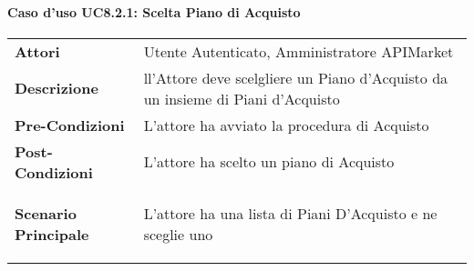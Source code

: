 \paragraph{Caso d'uso UC8.2.1: Scelta Piano di Acquisto}
\label{UC8.2.1}

\renewcommand*{\arraystretch}{1.6}
\begin{longtable}{ l | p{11cm}}
	\hline
	\rowcolor{Gray}
	\multicolumn{2}{c}{UC8.2.1: Scelta Piano di Acquisto} \\
	\hline
	\textbf{Attori} &Utente Autenticato, Amministratore APIMarket\\
	\textbf{Descrizione} & ll'Attore deve scelgliere un Piano d'Acquisto da un insieme di Piani d'Acquisto\\
	\textbf{Pre-Condizioni} &  L'attore ha avviato la procedura di Acquisto\\
	\textbf{Post-Condizioni}& L'attore ha scelto un piano di Acquisto\\
	\textbf{Scenario Principale} & \begin{enumerate*}[label=(\arabic*.),itemjoin={\newline}]
		\item L'attore ha una lista di Piani D'Acquisto e ne sceglie uno
	\end{enumerate*}\\
\end{longtable}
